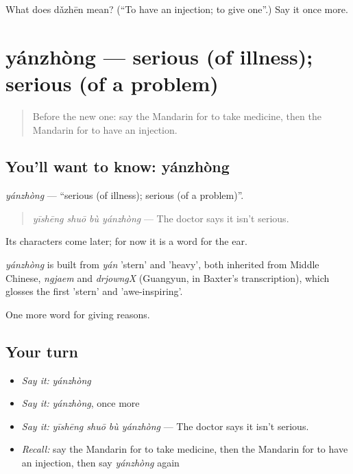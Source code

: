 \begin{tcolorbox}[breakable,colback=teal!4,colframe=teal!35!black,title={Before you move on}]
What does dǎzhēn mean? (\textquotedblleft{}To have an injection; to give one\textquotedblright{}.) Say it once more.
\end{tcolorbox}
\section[yánzhòng]{yánzhòng — serious (of illness); serious (of a problem)}

\label{lesson:ZH-C228-yanzhong}



\begin{quote}
Before the new one: say the Mandarin for to take medicine, then the Mandarin for to have an injection.
\end{quote}

\subsection*{You'll want to know: yánzhòng}
\emph{yánzhòng} — \textquotedblleft{}serious (of illness); serious (of a problem)\textquotedblright{}.

\begin{quote}
\emph{yīshēng shuō bù yánzhòng} — The doctor says it isn't serious.
\end{quote}

Its characters come later; for now it is a word for the ear.

\begin{cousinweb}
\emph{yánzhòng} is built from \emph{yán} 'stern' and  'heavy', both inherited from Middle Chinese, \emph{ngjaem} and \emph{drjowngX} (Guangyun, in Baxter's transcription), which glosses the first 'stern' and 'awe-inspiring'.
\end{cousinweb}

\begin{grammarlens}[title={What you've built}]
One more word for giving reasons.
\end{grammarlens}

\subsection*{Your turn}
\begin{itemize}
\raggedright
  \item \emph{Say it:} \emph{yánzhòng}
  \item \emph{Say it:} \emph{yánzhòng}, once more
  \item \emph{Say it:} \emph{yīshēng shuō bù yánzhòng} — The doctor says it isn't serious.
  \item \emph{Recall:} say the Mandarin for to take medicine, then the Mandarin for to have an injection, then say \emph{yánzhòng} again
\end{itemize}


